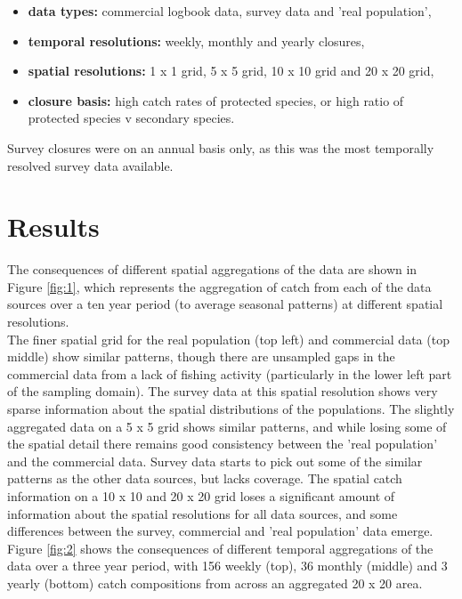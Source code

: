 \documentclass[review]{elsarticle}
\begin{document}
\begin{itemize}
	\item \textbf{data types:} commercial logbook data, survey data and
		'real population',
	\item \textbf{temporal resolutions:} weekly, monthly and yearly
		closures,
	\item \textbf{spatial resolutions:} 1 x 1 grid, 5 x 5 grid, 10 x 10
		grid and 20 x 20 grid,
	\item \textbf{closure basis:} high catch rates of protected species, or
		high ratio of protected species v secondary species.
\end{itemize}

Survey closures were on an annual basis only, as this was the most temporally
resolved survey data available.

\section{Results}

The consequences of different spatial aggregations of the data are shown in
Figure \ref{fig:1}, which represents the aggregation of catch from each of the
data sources over a ten year period (to average seasonal patterns) at different
spatial resolutions. \\

The finer spatial grid for the real population (top left) and commercial data
(top middle) show similar patterns, though there are unsampled gaps in the
commercial data from a lack of fishing activity (particularly in the lower left
part of the sampling domain). The survey data at this spatial resolution shows
very sparse information about the spatial distributions of the populations. The
slightly aggregated data on a 5 x 5 grid shows similar patterns, and while
losing some of the spatial detail there remains good consistency between the
'real population' and the commercial data. Survey data starts to pick out some
of the similar patterns as the other data sources, but lacks coverage. The
spatial catch information on a 10 x 10 and 20 x 20 grid loses a significant
amount of information about the spatial resolutions for all data sources, and
some differences between the survey, commercial and 'real population' data
emerge. \\

Figure \ref{fig:2} shows the consequences of different temporal aggregations of
the data over a three year period, with 156 weekly (top), 36 monthly (middle)
and 3 yearly (bottom) catch compositions from across an aggregated 20 x 20
area. \\
\end{document}
